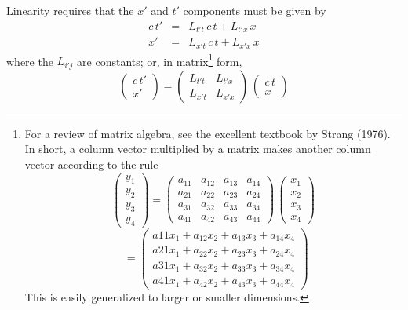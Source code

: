 Linearity requires that the $x'$ and $t'$ components must be given by
\begin{eqnarray}
c\,t' & = & L_{t't}\, c\,t + L_{t'x}\, x \nonumber\\
x' & = & L_{x't}\, c\,t + L_{x'x}\, x
\end{eqnarray}
where the $L_{i'j}$ are constants; or, in matrix\footnote{For a review
of matrix algebra, see the excellent textbook by Strang (1976).  In
short, a column vector multiplied by a matrix makes another column
vector according to the rule
$$
\left(\begin{array}{c} y_1\\ y_2\\ y_3\\ y_4 \end{array}\right) =
\left(\begin{array}{cccc}
a_{11}&a_{12}&a_{13}&a_{14}\\
a_{21}&a_{22}&a_{23}&a_{24}\\
a_{31}&a_{32}&a_{33}&a_{34}\\
a_{41}&a_{42}&a_{43}&a_{44}
\end{array}\right)\,
\left(\begin{array}{c} x_1\\ x_2\\ x_3\\ x_4 \end{array}\right)
$$
$$
\;\;= \left(\begin{array}{c}
a{11}x_1+a_{12}x_2+a_{13}x_3+a_{14}x_4 \\
a{21}x_1+a_{22}x_2+a_{23}x_3+a_{24}x_4 \\
a{31}x_1+a_{32}x_2+a_{33}x_3+a_{34}x_4 \\
a{41}x_1+a_{42}x_2+a_{43}x_3+a_{44}x_4
\end{array}\right)
$$
This is easily generalized to larger or smaller dimensions.} form,
\begin{equation}
\left(\begin{array}{c} c\,t' \\ x' \end{array}\right) =
\left(\begin{array}{cc} L_{t't} & L_{t'x} \\
L_{x't} & L_{x'x}\end{array}\right)
\,
\left(\begin{array}{c} c\,t \\ x \end{array}\right)
\end{equation}

